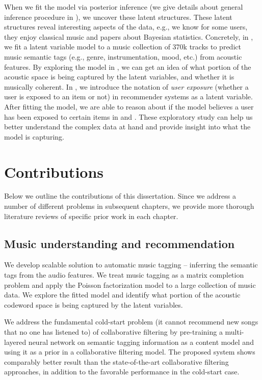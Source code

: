 When we fit the model via posterior inference (we give details about general inference procedure in ), we uncover these latent structures. These latent structures reveal interesting aspects of the data, e.g., we know for some users, they enjoy classical music and papers about Bayesian statistics. Concretely, in , we fit a latent variable model to a music collection of 370k tracks to predict music semantic tags (e.g., genre, instrumentation, mood, etc.) from acoustic features. By exploring the model in , we can get an idea of what portion of the acoustic space is being captured by the latent variables, and whether it is musically coherent. In , we introduce the notation of \textit{user exposure} (whether a user is exposed to an item or not) in recommender systems as a latent variable. After fitting the model, we are able to reason about if the model believes a user has been exposed to certain items in  and . These exploratory study can help us better understand the complex data at hand and provide insight into what the model is capturing. 

\section{Contributions}\label{chpt:intro:sec:contribution}
Below we outline the contributions of this dissertation. Since we address a number of different problems in subsequent chapters, we provide more thorough literature reviews of specific prior work in each chapter.

\subsection{Music understanding and recommendation}
We develop scalable solution to automatic music tagging -- inferring the semantic tags from the audio features. We treat music tagging as a matrix completion problem and apply the Poisson factorization model to a large collection of music data. We explore the fitted model and identify what portion of the acoustic codeword space is being captured by the latent variables.

We address the fundamental cold-start problem (it cannot recommend new songs that no one has listened to) of collaborative filtering by pre-training a multi-layered neural network on semantic tagging information as a content model and using it as a prior in a collaborative filtering model.  The proposed system shows comparably better result than the state-of-the-art collaborative filtering approaches, in addition to the favorable performance in the cold-start case. 

